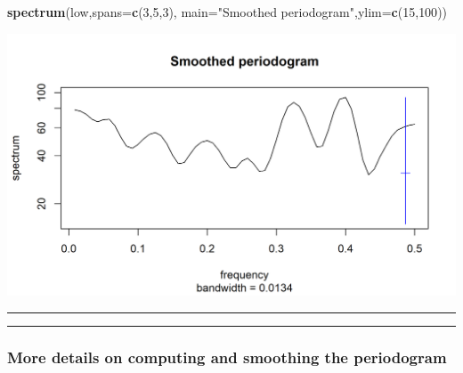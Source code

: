 \documentclass[]{article}
\newenvironment{Shaded}{\begin{snugshade}}{\end{snugshade}}
\newcommand{\KeywordTok}[1]{\textcolor[rgb]{0.13,0.29,0.53}{\textbf{#1}}}
\newcommand{\DataTypeTok}[1]{\textcolor[rgb]{0.13,0.29,0.53}{#1}}
\newcommand{\DecValTok}[1]{\textcolor[rgb]{0.00,0.00,0.81}{#1}}
\newcommand{\StringTok}[1]{\textcolor[rgb]{0.31,0.60,0.02}{#1}}
\newcommand{\NormalTok}[1]{#1}
\begin{document}
\begin{Shaded}
\begin{Highlighting}[]
\KeywordTok{spectrum}\NormalTok{(low,}\DataTypeTok{spans=}\KeywordTok{c}\NormalTok{(}\DecValTok{3}\NormalTok{,}\DecValTok{5}\NormalTok{,}\DecValTok{3}\NormalTok{), }\DataTypeTok{main=}\StringTok{"Smoothed periodogram"}\NormalTok{,}\DataTypeTok{ylim=}\KeywordTok{c}\NormalTok{(}\DecValTok{15}\NormalTok{,}\DecValTok{100}\NormalTok{))}
\end{Highlighting}
\end{Shaded}

\begin{center}\includegraphics{figure/intro-smoothed_periodogram-1} \end{center}

\begin{center}\rule{0.5\linewidth}{\linethickness}\end{center}

\begin{center}\rule{0.5\linewidth}{\linethickness}\end{center}

\subsubsection{More details on computing and smoothing the
periodogram}\label{more-details-on-computing-and-smoothing-the-periodogram}
\end{document}
